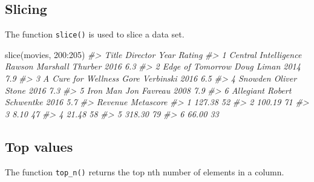\documentclass[
]{book}
\newenvironment{Shaded}{\begin{snugshade}}{\end{snugshade}}
\newcommand{\CommentTok}[1]{\textcolor[rgb]{0.56,0.35,0.01}{\textit{#1}}}
\newcommand{\DecValTok}[1]{\textcolor[rgb]{0.00,0.00,0.81}{#1}}
\newcommand{\FunctionTok}[1]{\textcolor[rgb]{0.00,0.00,0.00}{#1}}
\newcommand{\NormalTok}[1]{#1}
\newcommand{\SpecialCharTok}[1]{\textcolor[rgb]{0.00,0.00,0.00}{#1}}
\begin{document}
\hypertarget{slicing}{%
\subsection{Slicing}\label{slicing}}

The function \texttt{slice()} is used to slice a data set.

\begin{Shaded}
\begin{Highlighting}[]
\FunctionTok{slice}\NormalTok{(movies, }\DecValTok{200}\SpecialCharTok{:}\DecValTok{205}\NormalTok{)}
\CommentTok{\#\textgreater{}                  Title                Director Year Rating}
\CommentTok{\#\textgreater{} 1 Central Intelligence Rawson Marshall Thurber 2016    6.3}
\CommentTok{\#\textgreater{} 2     Edge of Tomorrow              Doug Liman 2014    7.9}
\CommentTok{\#\textgreater{} 3  A Cure for Wellness          Gore Verbinski 2016    6.5}
\CommentTok{\#\textgreater{} 4              Snowden            Oliver Stone 2016    7.3}
\CommentTok{\#\textgreater{} 5             Iron Man             Jon Favreau 2008    7.9}
\CommentTok{\#\textgreater{} 6            Allegiant        Robert Schwentke 2016    5.7}
\CommentTok{\#\textgreater{}   Revenue Metascore}
\CommentTok{\#\textgreater{} 1  127.38        52}
\CommentTok{\#\textgreater{} 2  100.19        71}
\CommentTok{\#\textgreater{} 3    8.10        47}
\CommentTok{\#\textgreater{} 4   21.48        58}
\CommentTok{\#\textgreater{} 5  318.30        79}
\CommentTok{\#\textgreater{} 6   66.00        33}
\end{Highlighting}
\end{Shaded}

\hypertarget{top-values}{%
\subsection{Top values}\label{top-values}}

The function \texttt{top\_n()} returns the top nth number of elements in a column.
\end{document}
